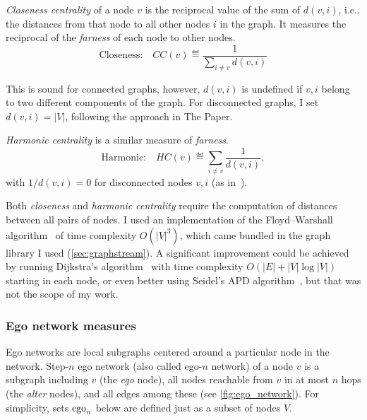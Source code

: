 \textsl{Closeness centrality} of a node $v$ is the reciprocal value of the sum of $d(v, i)$, i.e., the distances from that node to all other nodes $i$ in the graph.
It measures the reciprocal of the \textsl{farness} of each node to other nodes.
\begin{equation}
    \label{eqn:closeness_centrality}
    \text{Closeness:}\quad CC(v) \eqdef \frac{1}{\sum_{i \neq v} d(v, i)}
\end{equation}

This is sound for connected graphs, however, $d(v, i)$ is undefined if $v, i$ belong to two different components of the graph.
For disconnected graphs, I set $d(v, i) = \left\lvert V \right\rvert$, following the approach in The Paper.



\textsl{Harmonic centrality} is a similar measure of \textsl{farness}.
\begin{equation}
    \label{eqn:harmonic_centrality}
    \text{Harmonic:}\quad HC(v) \eqdef \sum_{i \neq v} \frac{1}{d(v, i)},
\end{equation}
with $1 / d(v, i) = 0$ for disconnected nodes $v, i$ (as in~\cite{MarchioriHarmonySmallworld2000}).

\begin{wrapfigure}[11]{R}{0.23\linewidth}
    
\end{wrapfigure}

Both \textsl{closeness} and \textsl{harmonic centrality} require the computation of distances between all pairs of nodes.
I used an implementation of the Floyd–Warshall algorithm~\cite{FloydAlgorithm97Shortest1962} of time complexity $O({\left\lvert V \right\rvert}^3)$, which came bundled in the graph library I used (\cref{sec:graphstream}).
A significant improvement could be achieved by running Dijkstra's algorithm~\cite{dijkstra1959note} with time complexity $O(\left\lvert E \right\rvert + \left\lvert V \right\rvert \log \left\lvert V \right\rvert )$ starting in each node, or even better using Seidel's APD algorithm~\cite{SeidelAllPairsShortestPathProblemUnweighted1995}, but that was not the scope of my work.

\subsubsection*{Ego network measures}

Ego networks are local subgraphs centered around a particular node in the network.
Step-$n$ ego network (also called ego-$n$ network) of a node $v$ is a subgraph including $v$ (the \textsl{ego} node), all nodes reachable from $v$ in at most $n$ hops (the \textsl{alter} nodes), and all edges among these (see \autoref{fig:ego_network}).
For simplicity, sets $\operatorname{ego}_n$ below are defined just as a subset of nodes $V$.

